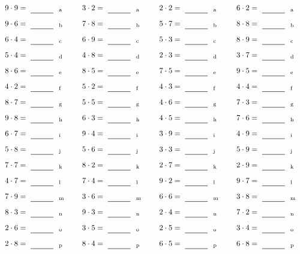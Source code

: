 \documentclass
[
  draft    = true,
  fontsize = 11pt,
  parskip  = half-
]
{scrartcl}
\begin{document}
\par\vfill\par
\begin{align*}
    \pline{9\cdot9}&=\rline{a}
  & \pline{3\cdot2}&=\rline{a}
  & \pline{2\cdot2}&=\rline{a}
  & \pline{6\cdot2}&=\rline{a} \\[1ex]
    \pline{9\cdot6}&=\rline{b}
  & \pline{7\cdot8}&=\rline{b}
  & \pline{5\cdot7}&=\rline{b}
  & \pline{8\cdot8}&=\rline{b} \\[1ex]
    \pline{6\cdot4}&=\rline{c}
  & \pline{6\cdot9}&=\rline{c}
  & \pline{5\cdot3}&=\rline{c}
  & \pline{8\cdot9}&=\rline{c} \\[1ex]
    \pline{5\cdot4}&=\rline{d}
  & \pline{4\cdot8}&=\rline{d}
  & \pline{2\cdot3}&=\rline{d}
  & \pline{3\cdot7}&=\rline{d} \\[1ex]
    \pline{8\cdot6}&=\rline{e}
  & \pline{8\cdot5}&=\rline{e}
  & \pline{7\cdot5}&=\rline{e}
  & \pline{9\cdot5}&=\rline{e} \\[1ex]
    \pline{4\cdot2}&=\rline{f}
  & \pline{5\cdot2}&=\rline{f}
  & \pline{4\cdot3}&=\rline{f}
  & \pline{4\cdot4}&=\rline{f} \\[1ex]
    \pline{8\cdot7}&=\rline{g}
  & \pline{5\cdot5}&=\rline{g}
  & \pline{4\cdot6}&=\rline{g}
  & \pline{7\cdot3}&=\rline{g} \\[1ex]
    \pline{9\cdot8}&=\rline{h}
  & \pline{6\cdot3}&=\rline{h}
  & \pline{4\cdot5}&=\rline{h}
  & \pline{7\cdot6}&=\rline{h} \\[1ex]
    \pline{6\cdot7}&=\rline{i}
  & \pline{9\cdot4}&=\rline{i}
  & \pline{3\cdot9}&=\rline{i}
  & \pline{4\cdot9}&=\rline{i} \\[1ex]
    \pline{5\cdot8}&=\rline{j}
  & \pline{5\cdot6}&=\rline{j}
  & \pline{3\cdot3}&=\rline{j}
  & \pline{5\cdot9}&=\rline{j} \\[1ex]
    \pline{7\cdot7}&=\rline{k}
  & \pline{8\cdot2}&=\rline{k}
  & \pline{2\cdot7}&=\rline{k}
  & \pline{2\cdot9}&=\rline{k} \\[1ex]
    \pline{4\cdot7}&=\rline{l}
  & \pline{7\cdot4}&=\rline{l}
  & \pline{9\cdot2}&=\rline{l}
  & \pline{9\cdot7}&=\rline{l} \\[1ex]
    \pline{7\cdot9}&=\rline{m}
  & \pline{3\cdot6}&=\rline{m}
  & \pline{6\cdot6}&=\rline{m}
  & \pline{3\cdot8}&=\rline{m} \\[1ex]
    \pline{8\cdot3}&=\rline{n}
  & \pline{9\cdot3}&=\rline{n}
  & \pline{2\cdot4}&=\rline{n}
  & \pline{7\cdot2}&=\rline{n} \\[1ex]
    \pline{2\cdot6}&=\rline{o}
  & \pline{3\cdot5}&=\rline{o}
  & \pline{2\cdot5}&=\rline{o}
  & \pline{3\cdot4}&=\rline{o} \\[1ex]
    \pline{2\cdot8}&=\rline{p}
  & \pline{8\cdot4}&=\rline{p}
  & \pline{6\cdot5}&=\rline{p}
  & \pline{6\cdot8}&=\rline{p}
\end{align*}
\end{document}
